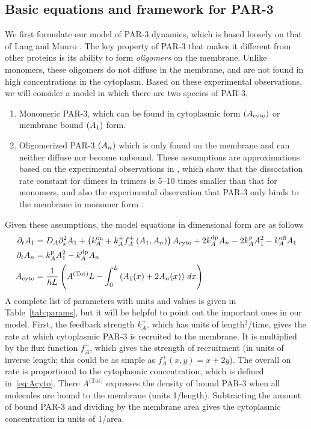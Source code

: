 \documentclass[11pt]{article}
\newcommand{\6}[1]{#1_{\text{6}}}
\newcommand{\3}[1]{#1_{\text{3}}}
\newcommand{\Tot}[1]{#1^\text{(Tot)}}
\newcommand{\A}[1]{#1_A}
\begin{document}
\subsection{Basic equations and framework for PAR-3 \label{sec:Par3}}
We first formulate our model of PAR-3 dynamics, which is based loosely on that of Lang and Munro \cite{lang2022oligomerization}. The key property of PAR-3 that makes it different from other proteins is its ability to form \emph{oligomers} on the membrane. Unlike monomers, these oligomers do not diffuse in the membrane, and are not found in high concentrations in the cytoplasm. Based on these experimental observations, we will consider a model in which there are two species of PAR-3, 
\begin{enumerate}
\item Monomeric PAR-3, which can be found in cytoplasmic form $(A_\text{cyto})$ or membrane bound $(A_1)$ form.
\item Oligomerized PAR-3 $(A_n)$ which is only found on the membrane and can neither diffuse nor become unbound. These assumptions are approximations based on the experimental observations in \cite[Fig.~3K]{lang2023oligomerization}, which show that the dissociation rate constant for dimers in trimers is 5--10 times smaller than that for monomers, and also the experimental observation that PAR-3 only binds to the membrane in monomer form \cite{lang2023oligomerization}.
\end{enumerate}
Given these assumptions, the model equations in dimensional form are as follows
\begin{subequations}
\label{eq:P3model}
\begin{align}
\Dt \MA & = \A{D} \Dx^2 \MA + \left(\A{\kon}+\A{\kf}\A{f}^+\left(\MA,\PA\right)\right)  \MAC + 2\A{\kdp}\PA -2\A{\kp} \MA^2 - \A{\koff}\MA \\
\Dt \PA & =\A{\kp}\MA^2- \A{\kdp}\PA \\ \label{eq:Acyto}
A_\text{cyto} & = \frac{1}{h L} \left(\Tot{A} L - \int_0^L \left(A_1(x)+2A_n(x)\right) \, dx \right)
\end{align}
\end{subequations}
A complete list of parameters with units and values is given in Table\ \ref{tab:params}, but it will be helpful to point out the important ones in our model. First, the feedback strength $k_A^+$, which has units of length$^2$/time, gives the rate at which cytoplasmic PAR-3 is recruited to the membrane. It is multiplied by the flux function $f_A^+$, which gives the strength of recruitment (in units of inverse length; this could be as simple as $f_A^+(x,y)=x+2y$). The overall on rate is proportional to the cytoplasmic concentration, which is defined in\ \eqref{eq:Acyto}. There $\Tot{A}$ expresses the density of bound PAR-3 when all molecules are bound to the membrane (units 1/length). Subtracting the amount of bound PAR-3 and dividing by the membrane area gives
the cytoplasmic concentration in units of 1/area.
\end{document}

